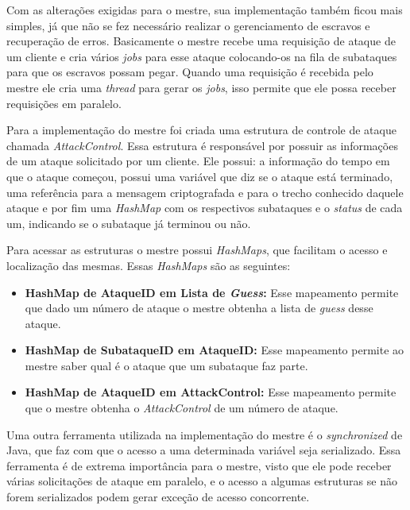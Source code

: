 \documentclass[
	12pt,				%
    oneside,			%
	a4paper,			%
	english,			%
	brazil,				%
	]{abntex2}
\begin{document}
Com as alterações exigidas para o mestre, sua implementação também ficou mais simples, já que não se fez necessário realizar o gerenciamento de escravos e recuperação de erros. Basicamente o mestre recebe uma requisição de ataque de um cliente e cria vários \textit{jobs} para esse ataque colocando-os na fila de subataques para que os escravos possam pegar. Quando uma requisição é recebida pelo mestre ele cria uma \textit{thread} para gerar os \textit{jobs}, isso permite que ele possa receber requisições em paralelo.

Para a implementação do mestre foi criada uma estrutura de controle de ataque chamada \textit{AttackControl}.
Essa estrutura é responsável por possuir as informações de um ataque solicitado por um cliente. Ele possui: a informação do tempo em que o ataque começou, possui uma variável que diz se o ataque está terminado, uma referência para a mensagem criptografada e para o trecho conhecido daquele ataque e por fim uma 	\textit{HashMap} com os respectivos subataques e o \textit{status} de cada um, indicando se o subataque já terminou ou não.
	
Para acessar as estruturas o mestre possui \textit{HashMaps}, que facilitam o acesso e localização das mesmas. 
Essas \textit{HashMaps} são as seguintes:

\begin{itemize}

	\item \textbf{HashMap de AtaqueID em Lista de \textit{Guess}:} Esse mapeamento permite que dado um número de ataque o
	mestre obtenha a lista de \textit{guess} desse ataque.
	
	\item \textbf{HashMap de SubataqueID em AtaqueID:} Esse mapeamento permite ao mestre saber qual é o ataque que um 
	subataque faz parte.
	
	\item \textbf{HashMap de AtaqueID em AttackControl:} Esse mapeamento permite que o mestre obtenha o
	\textit{AttackControl} de um número de ataque.
	
\end{itemize}

Uma outra ferramenta utilizada na implementação do mestre é o \textit{synchronized} de Java, que faz com que o acesso
a uma determinada variável seja serializado. Essa ferramenta é de extrema importância para o mestre, visto que ele pode
receber várias solicitações de ataque em paralelo, e o acesso a algumas estruturas se não forem serializados podem gerar
exceção de acesso concorrente.
\end{document}

